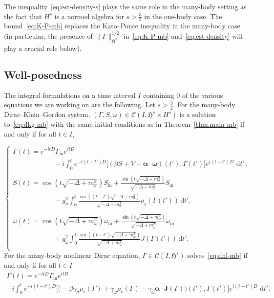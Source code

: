 \documentclass[AHL,Unicode,longabstracts,published]{cedram}
\newcommand{\rmin}{\mathrm{in}}
\newcommand{\cC}{\mathcal{C}}
\newcommand{\gH}{\mathfrak{H}}
\renewcommand\d[1]{{\ensuremath{\,\text{d}#1}}}
\newcommand{\dps}{\displaystyle}
\begin{document}
The inequality~\eqref{eq:est-density-s} plays the same role in the many-body setting as the fact that $H^s$ is a normed algebra for $s>\tfrac32$ in the one-body case. The bound~\eqref{eq:K-P-mb} replaces the Kato--Ponce inequality in the many-body case (in particular, the presence of $\|\Gamma\|_{\gH^{s'}}^{1/2}$ in~\eqref{eq:K-P-mb} and~\eqref{eq:est-density} will play a crucial role below).

\subsection{Well-posedness}

The integral formulations on a time interval $I$ containing $0$ of the various equations we are working on are the following. Let $s>\tfrac32$. For the many-body Dirac--Klein--Gordon system, $(\Gamma,S,\omega)\in\cC(I,\gH^s\times H^s)$ is a solution to~\eqref{eq:dkg-mb} with the same initial conditions as in Theorem~\ref{thm.main-mb} if and only if for all $t\in I$,


\begin{equation}
\begin{cases}\label{eq:dkg-mb-int}
\dps\Gamma(t)= e^{-itD} \Gamma_{\rmin} e^{itD}\\
\qquad\qquad\qquad- i\int_0^te^{-i(t-t')D}\big[({ \beta}S + V - {\bm \alpha}\cdot {\bm \omega})(t'),\Gamma(t')\big]e^{i(t-t')D}\,\d t'\,,
\\
\\
\dps S(t)=
\cos\left(t\sqrt{-\Delta + m^2_\sigma}\right) S_\rmin + \frac{\sin\left(t\sqrt{-\Delta + m^2_\sigma}\right)}{\sqrt{-\Delta + m^2_\sigma}}\dot{S}_\rmin
\\\dps\qquad\qquad\qquad -g_\sigma^2\int_0^t\frac{\sin\left((t-t')\sqrt{-\Delta + m^2_\sigma}\right)}{\sqrt{-\Delta + m^2_\sigma}}\rho_s(\Gamma(t'))\d t',\\
\\
\dps\omega(t)=
\cos\left(t\sqrt{-\Delta + m^2_\omega}\right)\omega_\rmin + \frac{\sin\left(t\sqrt{-\Delta + m^2_\omega}\right)}{\sqrt{-\Delta + m^2_\omega}}\dot{\omega}_\rmin
\\\dps\qquad\qquad\qquad +g_\omega^2\int_0^t\frac{\sin\left((t-t')\sqrt{-\Delta + m^2_\omega}\right)}{\sqrt{-\Delta + m^2_\omega}}J(\Gamma(t')) \d t'.\\
\end{cases}
\end{equation}
For the many-body nonlinear Dirac equation, $\Gamma\in\cC(I,\gH^s)$ solves~\eqref{eq:dnl-mb} if and only if for all $t\in I$
\begin{multline}\label{eq:dnl-mb-int}
\Gamma(t)= e^{-itD} \Gamma_{\rmin} e^{itD} \\
- i\int_0^te^{-i(t-t')D}\big[\big(- { \beta}\gamma_\sigma \rho_s(\Gamma) + \gamma_\omega \rho_v(\Gamma) - \gamma_\omega {\bm \alpha}\cdot {\bm J}(\Gamma)\big)(t'),\Gamma(t')\big]e^{i(t-t')D}\,\d t'.
\end{multline}
\end{document}
